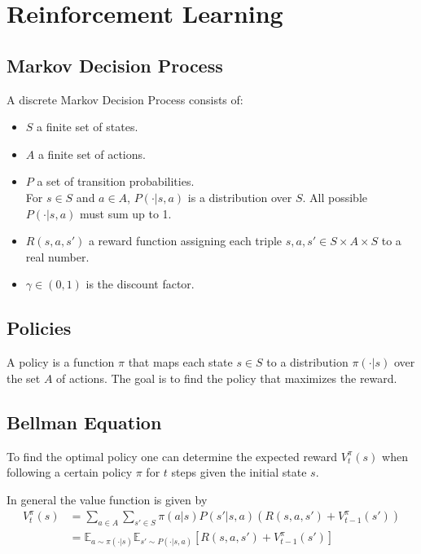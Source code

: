 \section{Reinforcement Learning}

\subsection{Markov Decision Process}

A discrete Markov Decision Process consists of:
\begin{itemize}
    \item $S$ a finite set of states.
    \item $A$ a finite set of actions.
    \item $P$ a set of transition probabilities. \\ For $s \in S$ and $a \in A$, $P(\cdot | s,a)$ is a distribution over $S$. All possible $P(\cdot | s,a)$ must sum up to 1.
    \item $R(s, a, s')$ a reward function assigning each triple $s, a, s' \in S \times A \times S$ to a real number.
    \item $\gamma \in (0,1)$ is the discount factor. %
\end{itemize}

\subsection{Policies}

A policy is a function $\pi$ that maps each state $s \in S$ to a distribution $\pi(\cdot|s)$ over the set $A$ of actions.
\newpar{}
The goal is to find the policy that maximizes the reward.

\subsection{Bellman Equation}
To find the optimal policy one can determine the expected reward $V_{t}^{\pi}(s)$ when following a certain policy $\pi$ for $t$ steps given the initial state $s$.

In general the value function is given by
\begin{align*}
    V_{t}^{\pi}(s) & = \sum_{a\in A} \sum_{s' \in S} \pi(a|s)P(s'|s,a)\left(R(s,a,s')+V_{t-1}^{\pi}(s')\right)                        \\
                   & = \mathbb{E}_{a \sim \pi(\cdot|s)} \mathbb{E}_{s' \sim P(\cdot|s, a)} \left[R(s,a,s') + V_{t-1}^{\pi}(s')\right]
\end{align*}


